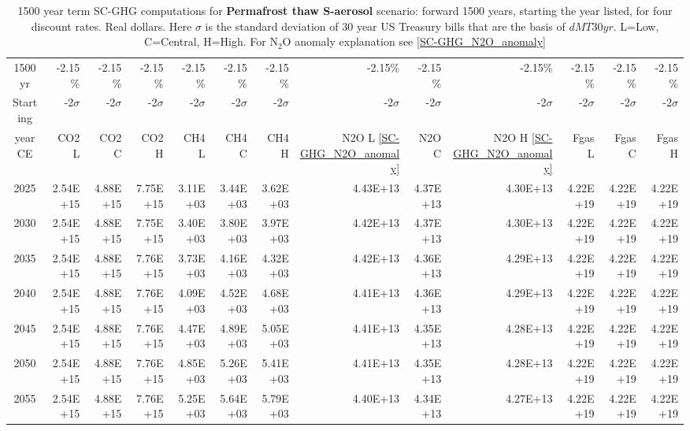 \documentclass{article}
\begin{document}
\begin{table}
   \caption{1500 year term SC-GHG computations for \textbf{Permafrost thaw S-aerosol} scenario: forward 1500 years, starting the year listed, for four discount rates. Real dollars. Here $\sigma$ is the standard deviation of 30 year US Treasury bills that are the basis of $dMT30yr$. L=Low, C=Central, H=High. For N$_2$O anomaly explanation see \ref{SC-GHG_N2O_anomaly}} 
\label{PVs_1500_yearSCC_SH3}
\small
\begin{tabular}{crrr|rrr|rrr|rrr}
1500 yr  & -2.15\%    & -2.15\%    & -2.15\%    & -2.15\%    & -2.15\%    & -2.15\%    & -2.15\%    & -2.15\%    & -2.15\%    & -2.15\%    & -2.15\%    & -2.15\%    \\
Starting & -2$\sigma$ & -2$\sigma$ & -2$\sigma$ & -2$\sigma$ & -2$\sigma$ & -2$\sigma$ & -2$\sigma$ & -2$\sigma$ & -2$\sigma$ & -2$\sigma$ & -2$\sigma$ & -2$\sigma$ \\
year CE  & CO2 L      & CO2 C      & CO2 H      & CH4 L      & CH4 C      & CH4 H      & N2O L \ref{SC-GHG_N2O_anomaly}     & N2O C      & N2O H \ref{SC-GHG_N2O_anomaly}      & Fgas L     & Fgas C     & Fgas H     \\
2025     & 2.54E+15   & 4.88E+15   & 7.75E+15   & 3.11E+03   & 3.44E+03   & 3.62E+03   & 4.43E+13   & 4.37E+13   & 4.30E+13   & 4.22E+19   & 4.22E+19   & 4.22E+19   \\
2030     & 2.54E+15   & 4.88E+15   & 7.75E+15   & 3.40E+03   & 3.80E+03   & 3.97E+03   & 4.42E+13   & 4.37E+13   & 4.30E+13   & 4.22E+19   & 4.22E+19   & 4.22E+19   \\
2035     & 2.54E+15   & 4.88E+15   & 7.76E+15   & 3.73E+03   & 4.16E+03   & 4.32E+03   & 4.42E+13   & 4.36E+13   & 4.29E+13   & 4.22E+19   & 4.22E+19   & 4.22E+19   \\
2040     & 2.54E+15   & 4.88E+15   & 7.76E+15   & 4.09E+03   & 4.52E+03   & 4.68E+03   & 4.41E+13   & 4.36E+13   & 4.29E+13   & 4.22E+19   & 4.22E+19   & 4.22E+19   \\
2045     & 2.54E+15   & 4.88E+15   & 7.76E+15   & 4.47E+03   & 4.89E+03   & 5.05E+03   & 4.41E+13   & 4.35E+13   & 4.28E+13   & 4.22E+19   & 4.22E+19   & 4.22E+19   \\
2050     & 2.54E+15   & 4.88E+15   & 7.76E+15   & 4.85E+03   & 5.26E+03   & 5.41E+03   & 4.41E+13   & 4.35E+13   & 4.28E+13   & 4.22E+19   & 4.22E+19   & 4.22E+19   \\
2055     & 2.54E+15   & 4.88E+15   & 7.76E+15   & 5.25E+03   & 5.64E+03   & 5.79E+03   & 4.40E+13   & 4.34E+13   & 4.27E+13   & 4.22E+19   & 4.22E+19   & 4.22E+19   \\

\end{tabular}
\end{table}
\end{document}
